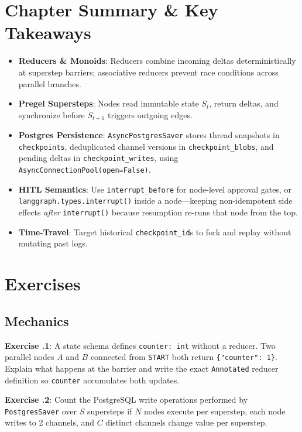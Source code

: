 \section{Chapter Summary \protect\& Key Takeaways}
\begin{itemize}[leftmargin=18pt]
  \item \textbf{Reducers \& Monoids}: Reducers combine incoming deltas deterministically at superstep barriers; associative reducers prevent race conditions across parallel branches.
  \item \textbf{Pregel Supersteps}: Nodes read immutable state $S_t$, return deltas, and synchronize before $S_{t+1}$ triggers outgoing edges.
  \item \textbf{Postgres Persistence}: \texttt{AsyncPostgresSaver} stores thread snapshots in \texttt{checkpoints}, deduplicated channel versions in \texttt{checkpoint\_blobs}, and pending deltas in \texttt{checkpoint\_writes}, using \texttt{AsyncConnectionPool(open=False)}.
  \item \textbf{HITL Semantics}: Use \texttt{interrupt\_before} for node-level approval gates, or \texttt{langgraph.types.interrupt()} inside a node—keeping non-idempotent side effects \emph{after} \texttt{interrupt()} because resumption re-runs that node from the top.
  \item \textbf{Time-Travel}: Target historical \texttt{checkpoint\_id}s to fork and replay without mutating past logs.
\end{itemize}

\section{Exercises}

\subsection*{Mechanics}
\textbf{Exercise \thechapter.1}: A state schema defines \texttt{counter: int} without a reducer. Two parallel nodes $A$ and $B$ connected from \texttt{START} both return \texttt{\{"counter": 1\}}. Explain what happens at the barrier and write the exact \texttt{Annotated} reducer definition so \texttt{counter} accumulates both updates.

\textbf{Exercise \thechapter.2}: Count the PostgreSQL write operations performed by \texttt{PostgresSaver} over $S$ supersteps if $N$ nodes execute per superstep, each node writes to 2 channels, and $C$ distinct channels change value per superstep.

